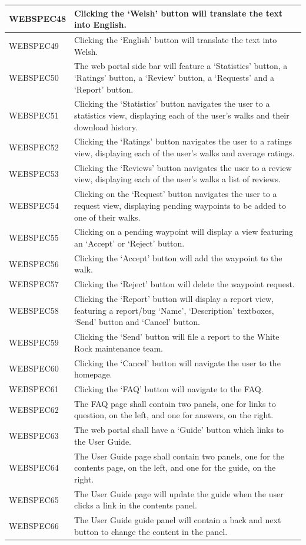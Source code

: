 \documentclass[11pt,a4paper]{article}
\begin{document}
\begin{longtable}{|p{2.5cm}p{13cm}|}
WEBSPEC48 & Clicking the `Welsh' button will translate the text into English. \\ \hline
WEBSPEC49 & Clicking the `English' button will translate the text into Welsh. \\ \hline
WEBSPEC50 & The web portal side bar will feature a `Statistics' button, a `Ratings' button, a `Review' button, a `Requests' and a `Report' button. \\ \hline
WEBSPEC51 & Clicking the `Statistics' button navigates the user to a statistics view, displaying each of the user's walks and their download history. \\ \hline
WEBSPEC52 & Clicking the `Ratings' button navigates the user to a ratings view, displaying each of the user's walks and average ratings. \\ \hline
WEBSPEC53 & Clicking the `Reviews' button navigates the user to a review view, displaying each of the user's walks a list of reviews. \\ \hline
WEBSPEC54 & Clicking on the `Request' button navigates the user to a request view, displaying pending waypoints to be added to one of their walks. \\ \hline
WEBSPEC55 & Clicking on a pending waypoint will display a view featuring an `Accept' or `Reject' button. \\ \hline
WEBSPEC56 & Clicking the `Accept' button will add the waypoint to the walk. \\ \hline
WEBSPEC57 & Clicking the `Reject' button will delete the waypoint request. \\ \hline
WEBSPEC58 & Clicking the `Report' button will display a report view, featuring a report/bug `Name', `Description' textboxes, `Send' button and `Cancel' button. \\ \hline
WEBSPEC59 & Clicking the `Send' button will file a report to the White Rock maintenance team. \\ \hline
WEBSPEC60 & Clicking the `Cancel' button will navigate the user to the homepage. \\ \hline
WEBSPEC61 & Clicking the `FAQ' button will navigate to the FAQ. \\ \hline
WEBSPEC62 & The FAQ page shall contain two panels, one for links to question, on the left, and one for answers, on the right. \\ \hline
WEBSPEC63 & The web portal shall have a `Guide' button which links to the User Guide. \\ \hline
WEBSPEC64 & The User Guide page shall contain two panels, one for the contents page, on the left, and one for the guide, on the right. \\ \hline
WEBSPEC65 & The User Guide page will update the guide when the user clicks a link in the contents panel.  \\ \hline
WEBSPEC66 & The User Guide guide panel will contain a back and next button to change the content in the panel. \\ \hline
\end{longtable}
\end{document}
